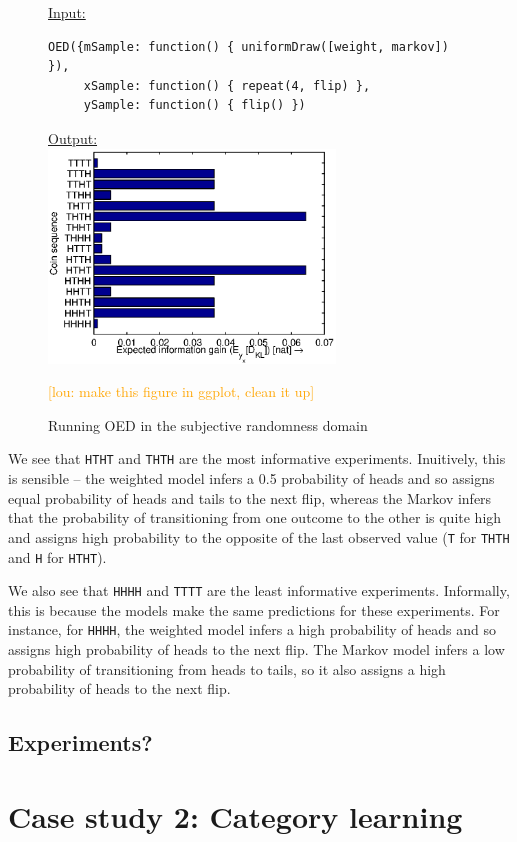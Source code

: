 \documentclass{article}
\newcommand{\lou}[1]{\textcolor{orange}{[lou: #1]}}
\begin{document}
\begin{figure}[h!]
\underline{\textsf{Input:}}
\begin{lstlisting}
OED({mSample: function() { uniformDraw([weight, markov]) }),
     xSample: function() { repeat(4, flip) },
     ySample: function() { flip() })
\end{lstlisting}

\underline{\textsf{Output:}}\\
\includegraphics[width=3in]{img/coin.eps}
\caption{Running OED in the subjective randomness domain}
\lou{make this figure in ggplot, clean it up}
\label{fig:run-coin}
\end{figure}

We see that \lstinline{HTHT} and \lstinline{THTH} are the most informative experiments.
Inuitively, this is sensible -- the weighted model infers a 0.5 probability of heads and so assigns equal probability of heads and tails to the next flip, whereas the Markov infers that the probability of transitioning from one outcome to the other is quite high and assigns high probability to the opposite of the last observed value (\lstinline{T} for \lstinline{THTH} and \lstinline{H} for \lstinline{HTHT}).

We also see that \lstinline{HHHH} and \lstinline{TTTT} are the least informative experiments.
Informally, this is because the models make the same predictions for these experiments.
For instance, for \lstinline{HHHH}, the weighted model infers a high probability of heads and so assigns high probability of heads to the next flip.
The Markov model infers a low probability of transitioning from heads to tails, so it also assigns a high probability of heads to the next flip.

\subsection{Experiments?}


\section{Case study 2: Category learning}
\end{document}
